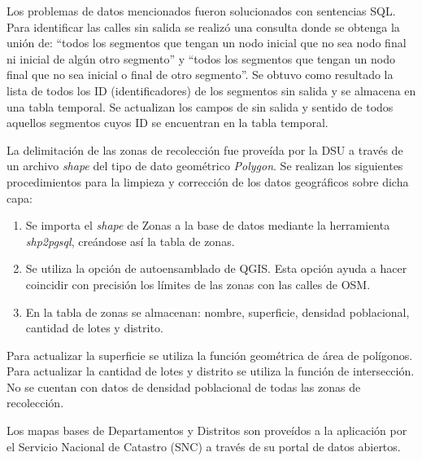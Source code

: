 Los problemas de datos mencionados fueron solucionados con sentencias SQL. Para identificar las calles sin salida se realizó una consulta donde se obtenga la unión de: ``todos los segmentos que tengan un nodo inicial que no sea nodo final ni inicial de algún otro segmento'' y ``todos los segmentos que tengan un nodo final que no sea inicial o final de otro segmento''. Se obtuvo como resultado la lista de todos los ID (identificadores) de los segmentos sin salida y se almacena en una tabla temporal. Se actualizan los campos de sin salida y sentido de todos aquellos segmentos cuyos ID se encuentran en la tabla temporal.

La delimitación de las zonas de recolección fue proveída por la DSU a través de un archivo \textit{shape} del tipo de dato geométrico \textit{Polygon}. Se realizan los siguientes procedimientos para la limpieza y corrección de los datos geográficos sobre dicha capa:

\begin{enumerate}
\item Se importa el \textit{shape} de Zonas a la base de datos mediante la herramienta \textit{shp2pgsql}, creándose así la tabla de zonas.
\item Se utiliza la opción de autoensamblado de QGIS. Esta opción ayuda a hacer coincidir con precisión los límites de las zonas con las calles de OSM.
\item En la tabla de zonas se almacenan: nombre, superficie, densidad poblacional, cantidad de lotes y distrito.
\end{enumerate}

Para actualizar la superficie se utiliza la función geométrica de área de polígonos. Para actualizar la cantidad de lotes y distrito se utiliza la función de intersección. No se cuentan con datos de densidad poblacional de todas las zonas de recolección.

Los mapas bases de Departamentos y Distritos son proveídos a la aplicación por el Servicio Nacional de Catastro (SNC) a través de su portal de datos abiertos.

